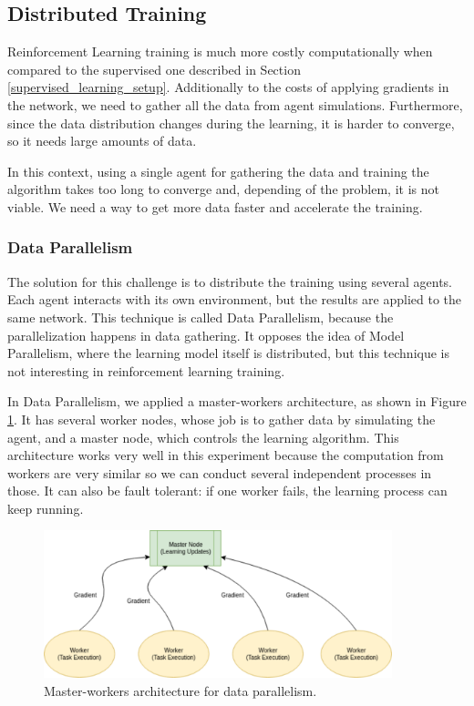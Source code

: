 \subsection{Distributed Training}\label{sec:distributedtraining}
Reinforcement Learning training is much more costly computationally when compared to the supervised one described in Section \ref{supervised_learning_setup}. Additionally to the costs of applying gradients in the network, we need to gather all the data from agent simulations. Furthermore, since the data distribution changes during the learning, it is harder to converge, so it needs large amounts of data.

In this context, using a single agent for gathering the data and training the algorithm takes too long to converge and, depending of the problem, it is not viable. We need a way to get more data faster and accelerate the training.

\subsubsection{Data Parallelism}

The solution for this challenge is to distribute the training using several agents. Each agent interacts with its own environment, but the results are applied to the same network. This technique is called Data Parallelism, because the parallelization happens in data gathering. It opposes the idea of Model Parallelism, where the learning model itself is distributed, but this technique is not interesting in reinforcement learning training.

In Data Parallelism, we applied a master-workers architecture, as shown in Figure \ref{fig:master-worker}. It has several worker nodes, whose job is to gather data by simulating the agent, and a master node, which controls the learning algorithm. This architecture works very well in this experiment because the computation from workers are very similar so we can conduct several independent processes in those. It can also be fault tolerant: if one worker fails, the learning process can keep running.

\begin{figure}[H]
	\centering
	\includegraphics[width=0.9\textwidth]{Cap5/master-worker.eps}
	\caption{ Master-workers architecture for data parallelism.
	}
	\label{fig:master-worker}
\end{figure}

